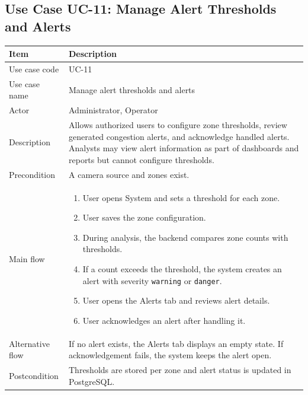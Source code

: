 \documentclass[12pt,a4paper]{report}
\begin{document}
\subsection{Use Case UC-11: Manage Alert Thresholds and Alerts}
\begin{longtable}{|p{3.6cm}|p{10.4cm}|}
\hline
\rowcolor{HeaderBlue}\textbf{Item} & \textbf{Description} \\
\hline
Use case code & UC-11 \\
\hline
Use case name & Manage alert thresholds and alerts \\
\hline
Actor & Administrator, Operator \\
\hline
Description & Allows authorized users to configure zone thresholds, review generated congestion alerts, and acknowledge handled alerts. Analysts may view alert information as part of dashboards and reports but cannot configure thresholds. \\
\hline
Precondition & A camera source and zones exist. \\
\hline
Main flow &
\begin{enumerate}
    \item User opens System and sets a threshold for each zone.
    \item User saves the zone configuration.
    \item During analysis, the backend compares zone counts with thresholds.
    \item If a count exceeds the threshold, the system creates an alert with severity \texttt{warning} or \texttt{danger}.
    \item User opens the Alerts tab and reviews alert details.
    \item User acknowledges an alert after handling it.
\end{enumerate} \\
\hline
Alternative flow & If no alert exists, the Alerts tab displays an empty state. If acknowledgement fails, the system keeps the alert open. \\
\hline
Postcondition & Thresholds are stored per zone and alert status is updated in PostgreSQL. \\
\hline
\end{longtable}
\end{document}
